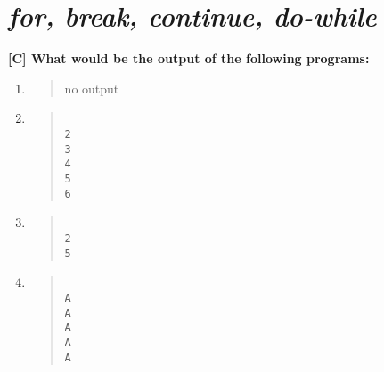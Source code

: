 \documentclass{report}
\begin{document}
\section*{\textit{for, break, continue, do-while}}

\textbf{[C] What would be the output of the following programs:}
\begin{enumerate}
    \renewcommand{\labelenumi}{\alph{enumi}}
  \item \begin{quote}
      no output\\
  \end{quote}

  \item \begin{quote} \begin{verbatim}

2
3
4
5
6
  \end{verbatim} \end{quote}

  \item \begin{quote} \begin{verbatim} 

2
5
  \end{verbatim} \end{quote}

  \item \begin{quote} \begin{verbatim} 

A
A
A
A
A
  \end{verbatim} \end{quote}
\end{enumerate}
\end{document}
